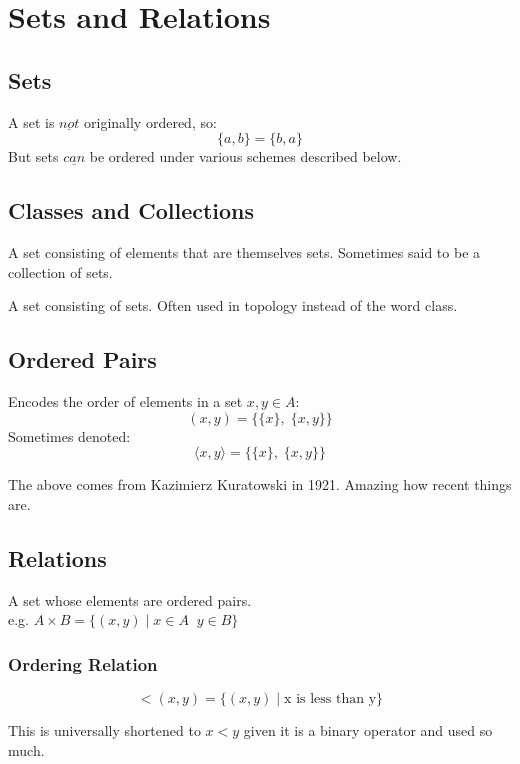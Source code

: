 \chapter{Sets and Relations}
\section{Sets}
A set is $\underline{not}$ originally ordered, so:
\[ \{a , b\} = \{b, a\} \]
But sets $\underline{can}$ be ordered under various schemes described below.
\section{Classes and Collections}
\begin{defn}[Class]
	A set consisting of elements that are themselves sets. Sometimes said to be a collection of sets.
\end{defn}
\begin{defn}[Collections]
	A set consisting of sets. Often used in topology instead of the word class.
\end{defn}

\section{Ordered Pairs}
\begin{defn}
	Encodes the order of elements in a set $x, y \in A$:
	\[ (x, y) = \{ \{ x \}, \; \{ x, y \} \} \]
	Sometimes denoted:
	\[ \langle x, y \rangle = \{ \{ x \}, \; \{x, y\} \} \]
\end{defn}
The above comes from Kazimierz Kuratowski in 1921. Amazing how recent things are.

\section{Relations}
\begin{defn}[Relation]
	A set whose elements are ordered pairs. \\
	
	e.g. $A \times B = \{ (x, y) \mid x \in A \; \; y \in B \}$
\end{defn}

\subsection{Ordering Relation}
\begin{defn}
	\[ < (x, y)  = \{ (x, y) \mid \text{x is less than y} \} \]
\end{defn}
This is universally shortened to $x < y$ given it is a binary operator and used so much.
